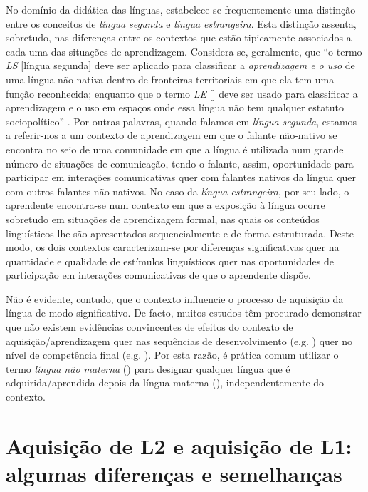 \documentclass[output=paper]{LSP/langsci}
\begin{document}
No domínio da didática das línguas, estabelece-se frequentemente uma distinção entre os conceitos de \textit{língua segunda} e \textit{língua estrangeira}. Esta distinção assenta, sobretudo, nas diferenças entre os contextos que estão tipicamente associados a cada uma das situações de aprendizagem. Considera-se, geralmente, que ``o termo \textit{LS} [língua segunda] deve ser aplicado para classificar a \textit{aprendizagem e o uso} de uma língua não-nativa dentro de fronteiras territoriais em que ela tem uma função reconhecida; enquanto que o termo \textit{LE} [] deve ser usado para classificar a aprendizagem e o uso em espaços onde essa língua não tem qualquer estatuto sociopolítico'' \citep[1]{leiria2004}. Por outras palavras, quando falamos em \textit{língua segunda}, estamos a referir-nos a um contexto de aprendizagem em que o falante não-nativo se encontra no seio de uma comunidade em que a língua é utilizada num grande número de situações de comunicação, tendo o falante, assim, oportunidade para participar em interações comunicativas quer com falantes nativos da língua quer com outros falantes não-nativos. No caso da \textit{língua estrangeira}, por seu lado, o aprendente encontra-se num contexto em que a exposição à língua ocorre sobretudo em situações de aprendizagem formal, nas quais os conteúdos linguísticos lhe são apresentados sequencialmente e de forma estruturada. Deste modo, os dois contextos caracterizam-se por diferenças significativas quer na quantidade e qualidade de estímulos linguísticos quer nas oportunidades de participação em interações comunicativas de que o aprendente dispõe.

Não é evidente, contudo, que o contexto influencie o processo de aquisição da língua de modo significativo. De facto, muitos estudos têm procurado demonstrar que não existem evidências convincentes de efeitos do contexto de aquisição/aprendizagem quer nas sequências de desenvolvimento (e.g. \citealt{pica1983}) quer no nível de competência final (e.g. \citealt{long1983}). Por esta razão, é prática comum utilizar o termo \textit{língua não materna} () para designar qualquer língua que é adquirida/aprendida depois da língua materna (), independentemente do contexto.

\section{Aquisição de L2 e aquisição de L1: algumas diferenças e semelhanças}
\label{sec:madeira_aquisicao}
\end{document}
